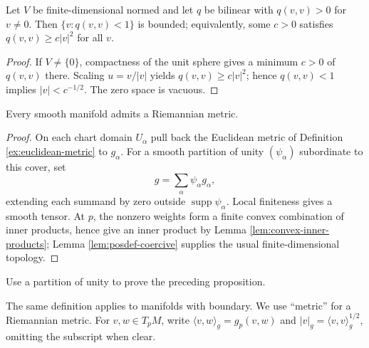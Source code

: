 \begin{lemma}
\label{lem:posdef-coercive}
\leanok
Let $V$ be finite-dimensional normed and let $q$ be bilinear with $q(v,v)>0$ for $v\ne0$. Then $\{v:q(v,v)<1\}$ is bounded; equivalently, some $c>0$ satisfies $q(v,v)\ge c|v|^2$ for all $v$.
\end{lemma}
\begin{proof}
\leanok
\sketch If $V\ne\{0\}$, compactness of the unit sphere gives a minimum $c>0$ of $q(v,v)$ there. Scaling $u=v/|v|$ yields $q(v,v)\ge c|v|^2$; hence $q(v,v)<1$ implies $|v|<c^{-1/2}$. The zero space is vacuous.
\end{proof}

\begin{proposition}
\label{prop:existence-riemannian-metric}
\leanok
{}
Every smooth manifold admits a Riemannian metric.
\end{proposition}
\begin{proof}
\leanok
{}
\sketch On each chart domain $U_\alpha$ pull back the Euclidean metric of Definition \ref{ex:euclidean-metric} to $g_\alpha$. For a smooth partition of unity $(\psi_\alpha)$ subordinate to this cover, set
\[
g=\sum_\alpha\psi_\alpha g_\alpha,
\]
extending each summand by zero outside $\operatorname{supp}\psi_\alpha$. Local finiteness gives a smooth tensor. At $p$, the nonzero weights form a finite convex combination of inner products, hence give an inner product by Lemma \ref{lem:convex-inner-products}; Lemma \ref{lem:posdef-coercive} supplies the usual finite-dimensional topology.
\end{proof}

\begin{exercise}
\label{exer:partition-unity-proof}
\leanok
{}
Use a partition of unity to prove the preceding proposition.
\end{exercise}

The same definition applies to manifolds with boundary. We use ``metric'' for a Riemannian metric. For $v,w\in T_pM$, write $\langle v,w\rangle_g=g_p(v,w)$ and $|v|_g=\langle v,v\rangle_g^{1/2}$, omitting the subscript when clear.

